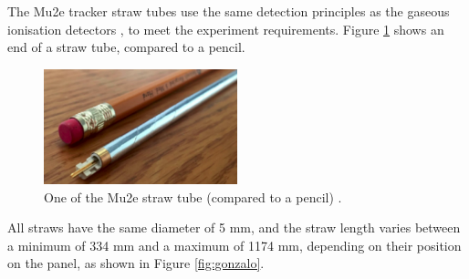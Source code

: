 The Mu2e tracker straw tubes use the same detection principles as the gaseous 
ionisation detectors \cite{kola}, to 
meet the experiment requirements.
Figure \ref{fig:trkpencil} shows an end of a straw tube, compared to a pencil.
\begin{figure}[!h]
    \centering
    \includegraphics[width =0.5\textwidth]{figures/png/Screenshot_20240327_000000.png}
    \caption[A Mu2e straw tube.]{One of the Mu2e straw tube (compared to a pencil) \cite{trk}.}
    \label{fig:trkpencil}
    \end{figure}


All straws have the same diameter of 5 mm, and the straw length 
varies between a minimum of 334 mm and a maximum of 1174 mm, 
depending on their position on the panel, as shown in Figure \ref{fig:gonzalo}.


